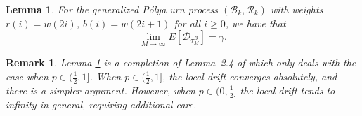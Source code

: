 \documentclass[twoside,12pt,a4paper]{article}
\newtheorem{lemma}{Lemma}[section]
\newtheorem{remark}{Remark}[section]
\numberwithin{equation}{section}
\begin{document}
	\begin{lemma} \label{lm: convergence of mean of discrepancies}
		For the generalized P\'{o}lya urn process $(\mathcal{B}_{k},\mathcal{R}_{k})$ with weights $r(i)= w(2i)$, $b(i) = w(2i+1)$ for all $i\geq 0$, we have that
		$$
		\lim_{M\to\infty} E[\mathcal{D}_{\tau_M^B}] = \gamma. 
		$$
	\end{lemma} 
	\begin{remark}
		Lemma \ref{lm: convergence of mean of discrepancies} is a completion of Lemma~2.4 of \cite{KMP22} which only deals with the case when ${p \in (\frac{1}{2}, 1]}$. When $p \in (\frac{1}{2}, 1]$, the local drift converges absolutely, and there is a simpler argument. However, when $p \in (0,\frac{1}{2}]$ the local drift tends to infinity in general, requiring additional care.
	\end{remark}
\end{document}
